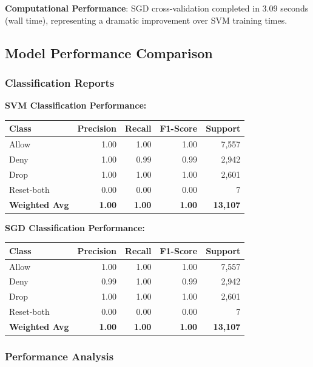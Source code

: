 \documentclass[12pt,a4paper]{article}
\begin{document}
\textbf{Computational Performance}: SGD cross-validation completed in 3.09 seconds (wall time), representing a dramatic improvement over SVM training times.

\subsection{Model Performance Comparison}

\subsubsection{Classification Reports}

\textbf{SVM Classification Performance:}
\begin{center}
\begin{tabular}{|l|r|r|r|r|}
\hline
\textbf{Class} & \textbf{Precision} & \textbf{Recall} & \textbf{F1-Score} & \textbf{Support} \\
\hline
Allow & 1.00 & 1.00 & 1.00 & 7,557 \\
\hline
Deny & 1.00 & 0.99 & 0.99 & 2,942 \\
\hline
Drop & 1.00 & 1.00 & 1.00 & 2,601 \\
\hline
Reset-both & 0.00 & 0.00 & 0.00 & 7 \\
\hline
\textbf{Weighted Avg} & \textbf{1.00} & \textbf{1.00} & \textbf{1.00} & \textbf{13,107} \\
\hline
\end{tabular}
\end{center}

\textbf{SGD Classification Performance:}
\begin{center}
\begin{tabular}{|l|r|r|r|r|}
\hline
\textbf{Class} & \textbf{Precision} & \textbf{Recall} & \textbf{F1-Score} & \textbf{Support} \\
\hline
Allow & 1.00 & 1.00 & 1.00 & 7,557 \\
\hline
Deny & 0.99 & 1.00 & 0.99 & 2,942 \\
\hline
Drop & 1.00 & 1.00 & 1.00 & 2,601 \\
\hline
Reset-both & 0.00 & 0.00 & 0.00 & 7 \\
\hline
\textbf{Weighted Avg} & \textbf{1.00} & \textbf{1.00} & \textbf{1.00} & \textbf{13,107} \\
\hline
\end{tabular}
\end{center}

\subsubsection{Performance Analysis}
\end{document}
